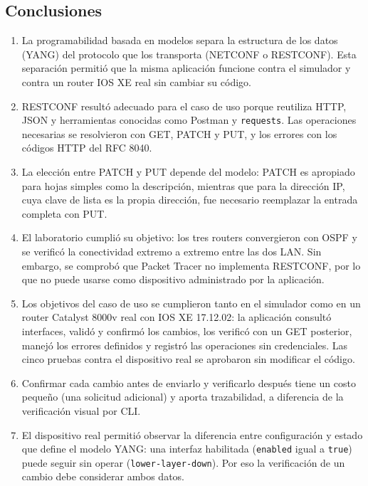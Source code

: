 \subsection{Conclusiones}
\begin{enumerate}
  \item La programabilidad basada en modelos separa la estructura de los datos (YANG) del protocolo que los transporta (NETCONF o RESTCONF). Esta separación permitió que la misma aplicación funcione contra el simulador y contra un router IOS XE real sin cambiar su código.
  \item RESTCONF resultó adecuado para el caso de uso porque reutiliza HTTP, JSON y herramientas conocidas como Postman y \texttt{requests}. Las operaciones necesarias se resolvieron con GET, PATCH y PUT, y los errores con los códigos HTTP del RFC 8040.
  \item La elección entre PATCH y PUT depende del modelo: PATCH es apropiado para hojas simples como la descripción, mientras que para la dirección IP, cuya clave de lista es la propia dirección, fue necesario reemplazar la entrada completa con PUT.
  \item El laboratorio cumplió su objetivo: los tres routers convergieron con OSPF y se verificó la conectividad extremo a extremo entre las dos LAN. Sin embargo, se comprobó que Packet Tracer no implementa RESTCONF, por lo que no puede usarse como dispositivo administrado por la aplicación.
  \item Los objetivos del caso de uso se cumplieron tanto en el simulador como en un router Catalyst 8000v real con IOS XE 17.12.02: la aplicación consultó interfaces, validó y confirmó los cambios, los verificó con un GET posterior, manejó los errores definidos y registró las operaciones sin credenciales. Las cinco pruebas contra el dispositivo real se aprobaron sin modificar el código.
  \item Confirmar cada cambio antes de enviarlo y verificarlo después tiene un costo pequeño (una solicitud adicional) y aporta trazabilidad, a diferencia de la verificación visual por CLI.
  \item El dispositivo real permitió observar la diferencia entre configuración y estado que define el modelo YANG: una interfaz habilitada (\texttt{enabled} igual a \texttt{true}) puede seguir sin operar (\texttt{lower-layer-down}). Por eso la verificación de un cambio debe considerar ambos datos.
\end{enumerate}

